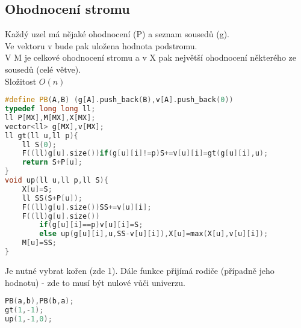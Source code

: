 \documentclass[11pt]{article}
\begin{document}
\subsection{Ohodnocení stromu}
Každý uzel má nějaké ohodnocení (\textsf{P}) a seznam sousedů (\textsf{g}). 
\\Ve vektoru \textsf{v} bude pak uložena hodnota podstromu.
\\V \textsf{M} je celkové ohodnocení stromu a v \textsf{X} pak největší ohodnocení některého ze sousedů (celé větve).
\\Složitost $O(n)$
\begin{lstlisting}[language=C++]
#define PB(A,B) (g[A].push_back(B),v[A].push_back(0))
typedef long long ll;
ll P[MX],M[MX],X[MX];
vector<ll> g[MX],v[MX];
ll gt(ll u,ll p){
    ll S(0);
    F((ll)g[u].size())if(g[u][i]!=p)S+=v[u][i]=gt(g[u][i],u);
    return S+P[u];
}
void up(ll u,ll p,ll S){
    X[u]=S;
    ll SS(S+P[u]);
    F((ll)g[u].size())SS+=v[u][i];
    F((ll)g[u].size())
        if(g[u][i]==p)v[u][i]=S;
        else up(g[u][i],u,SS-v[u][i]),X[u]=max(X[u],v[u][i]);
    M[u]=SS;
}
\end{lstlisting}
Je nutné vybrat kořen (zde 1). Dále funkce přijímá rodiče (případně jeho hodnotu) - zde to musí být nulové vůči univerzu.
\begin{lstlisting}[language=C++]
PB(a,b),PB(b,a);
gt(1,-1);
up(1,-1,0);
\end{lstlisting}
\end{document}
